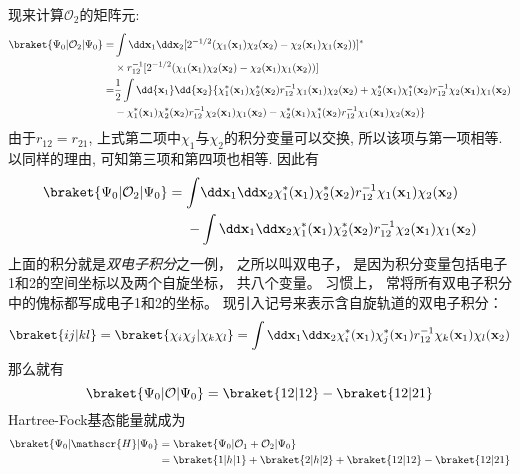 
现来计算$\mathcal{O}_2$的矩阵元:
\begin{align}
\braket{\Psi_0|\mathcal{O}_2|\Psi_0}=&\int\dd\mathbf{x}_1\dd\mathbf{x}_2[2^{-1/2}(\chi_1(\mathbf{x}_1)\chi_2(\mathbf{x}_2)-\chi_2(\mathbf{x}_1)\chi_1(\mathbf{x}_2))]^*\notag\\
\qquad&\times r_{12}^{-1} [2^{-1/2}(\chi_1(\mathbf{x}_1)\chi_2(\mathbf{x}_2)-\chi_2(\mathbf{x}_1)\chi_1(\mathbf{x}_2))]\notag\\
=&\frac{1}{2}\int\dd{\mathbf{x}_1}\dd{\mathbf{x}_2}\{\chi_1^*(\mathbf{x}_1)\chi_2^*(\mathbf{x}_2)r_{12}^{-1}\chi_1(\mathbf{x}_1)\chi_2(\mathbf{x}_2) + \chi_2^*(\mathbf{x}_1)\chi_1^*(\mathbf{x}_2)r_{12}^{-1}\chi_2(\mathbf{x_1})\chi_1(\mathbf{x}_2) \notag\\
\qquad& - \chi_1^*(\mathbf{x}_1)\chi_2^*(\mathbf{x}_2)r_{12}^{-1}\chi_2(\mathbf{x}_1)\chi_1(\mathbf{x}_2) - \chi_2^*(\mathbf{x}_1)\chi_1^*(\mathbf{x}_2)r_{12}^{-1}\chi_1(\mathbf{x_1})\chi_2(\mathbf{x}_2)
\}
\end{align}
由于$r_{12}=r_{21}$, 
上式第二项中$\chi_1$与$\chi_2$的积分变量可以交换, 
所以该项与第一项相等. 
以同样的理由, 
可知第三项和第四项也相等. 
因此有
\begin{align}
\braket{\Psi_0|\mathcal{O}_2|\Psi_0}=\int&\dd\mathbf{x}_1\dd\mathbf{x}_2 \chi_1^*(\mathbf{x}_1)\chi_2^*(\mathbf{x}_2)r_{12}^{-1}\chi_1(\mathbf{x}_1)\chi_2(\mathbf{x}_2)\notag\\
 -& \int\dd\mathbf{x}_1\dd\mathbf{x}_2\chi_1^*(\mathbf{x}_1)\chi_2^*(\mathbf{x}_2)r_{12}^{-1}\chi_2(\mathbf{x}_1)\chi_1(\mathbf{x}_2)
\end{align}
上面的积分就是\emph{双电子积分}之一例，
之所以叫双电子，
是因为积分变量包括电子1和2的空间坐标以及两个自旋坐标，
共八个变量。
习惯上，
常将所有双电子积分中的傀标都写成电子1和2的坐标。
现引入记号来表示含自旋轨道的双电子积分：
\begin{equation}
\braket{ij|kl}=\braket{\chi_i\chi_j|\chi_k\chi_l}=\int\dd\mathbf{x}_1\dd\mathbf{x}_2\chi_i^*(\mathbf{x}_1)\chi_j^*(\mathbf{x}_1)r_{12}^{-1}\chi_k(\mathbf{x}_1)\chi_l(\mathbf{x}_2)
\label{2.90}
\end{equation}
那么就有
\begin{equation}
\braket{\Psi_0|\mathcal{O}|\Psi_0}=\braket{12|12}-\braket{12|21}
\end{equation}
Hartree-Fock基态能量就成为
\begin{align}
\braket{\Psi_0|\mathscr{H}|\Psi_0}&=\braket{\Psi_0|\mathcal{O}_1+\mathcal{O}_2|\Psi_0}\notag\\
&=\braket{1|h|1}+\braket{2|h|2}+\braket{12|12}-\braket{12|21}
\end{align}

